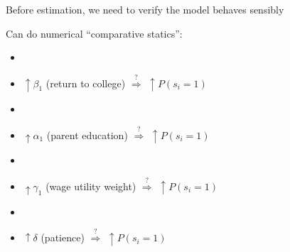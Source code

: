 \documentclass[aspectratio=169]{beamer}
\begin{document}
\begin{frame}

Before estimation, we need to verify the model behaves sensibly

\bigskip{}
\bigskip{}
\bigskip{}

Can do numerical ``comparative statics'':
\begin{itemize}
\item[]
\item $\uparrow\beta_1$ (return to college) $\overset{?}{\Rightarrow}$ $\uparrow P(s_i=1)$
\item[]
\item $\uparrow\alpha_1$ (parent education) $\overset{?}{\Rightarrow}$ $\uparrow P(s_i=1)$
\item[]
\item $\uparrow\gamma_1$ (wage utility weight) $\overset{?}{\Rightarrow}$ $\uparrow P(s_i=1)$
\item[]
\item $\uparrow \delta$ (patience) $\overset{?}{\Rightarrow}$ $\uparrow P(s_i=1)$
\end{itemize}


\end{frame}
\end{document}
